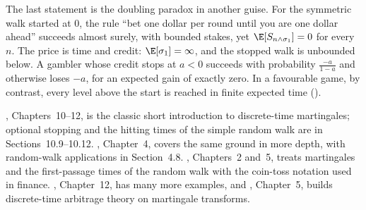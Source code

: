 The last statement is the doubling paradox in another guise. For the symmetric walk started at
$0$, the rule ``bet one dollar per round until you are one dollar ahead'' succeeds almost
surely, with bounded stakes, yet $\E[S_{n\wedge\sigma_1}]=0$ for every $n$. The price is time
and credit: $\E[\sigma_1]=\infty$, and the stopped walk is unbounded below. A gambler whose
credit stops at $a<0$ succeeds with probability $\frac{-a}{1-a}$ and otherwise loses $-a$,
for an expected gain of exactly zero. In a favourable game, by contrast, every level above the
start is reached in finite expected time ().

\furtherreading
\textcite{williams}, Chapters~10--12, is the classic short introduction to discrete-time
martingales; optional stopping and the hitting times of the simple random walk are in
Sections~10.9--10.12. \textcite{durrett}, Chapter~4, covers the same ground in more depth, with
random-walk applications in Section~4.8. \textcite{shreve1}, Chapters~2 and~5, treats
martingales and the first-passage times of the random walk with the coin-toss notation used
in finance. \textcite{grimmett-stirzaker}, Chapter~12, has many more examples, and
\textcite{follmer-schied}, Chapter~5, builds discrete-time arbitrage theory on martingale
transforms.
